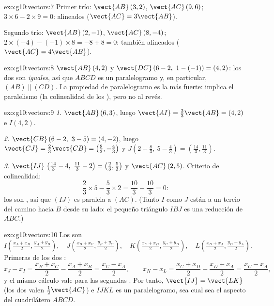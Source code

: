 \begin{solution}{exo:g10:vectors:7}
Primer trío: $\vect{AB}\,(3, 2)$, $\vect{AC}\,(9, 6)$;
$3 \times 6 - 2 \times 9 = 0$: alineados ($\vect{AC} = 3\vect{AB}$).

Segundo trío: $\vect{AB}\,(2, -1)$, $\vect{AC}\,(8, -4)$;
$2 \times (-4) - (-1) \times 8 = -8 + 8 = 0$: también alineados
($\vect{AC} = 4\vect{AB}$).
\end{solution}

\begin{solution}{exo:g10:vectors:8}
$\vect{AB}\,(4, 2)$ y $\vect{DC}\,(6-2,\ 1-(-1)) = (4, 2)$: los dos
 son \emph{iguales}, así que $ABCD$ es un paralelogramo y, en
particular, $(AB) \parallel (CD)$. La propiedad de paralelogramo es la más
fuerte: implica el paralelismo (la colinealidad de los ), pero no
al revés.
\end{solution}

\begin{solution}{exo:g10:vectors:9}
\emph{1.} $\vect{AB}\,(6, 3)$, luego $\vect{AI} = \frac23\vect{AB} =
(4, 2)$ e $I(4, 2)$.

\emph{2.} $\vect{CB}\,(6-2,\ 3-5) = (4, -2)$, luego
$\vect{CJ} = \frac23\vect{CB} = \left(\frac83, -\frac43\right)$ y
$J\left(2 + \frac83,\ 5 - \frac43\right) = \left(\frac{14}{3},
\frac{11}{3}\right)$.

\emph{3.} $\vect{IJ}\,\left(\frac{14}{3} - 4,\ \frac{11}{3} - 2\right) =
\left(\frac23, \frac53\right)$ y $\vect{AC}\,(2, 5)$. Criterio de
colinealidad:
\[
\frac23 \times 5 - \frac53 \times 2 = \frac{10}{3} - \frac{10}{3} = 0 :
\]
los  son , así que $(IJ)$ es paralela a $(AC)$. (Tanto
$I$ como $J$ están a un tercio del camino hacia $B$ desde su lado: el
pequeño triángulo $IBJ$ es una reducción de $ABC$.)
\end{solution}

\begin{solution}{exo:g10:vectors:10}
Los  son
\[
I\left(\tfrac{x_A + x_B}{2}, \tfrac{y_A + y_B}{2}\right), \quad
J\left(\tfrac{x_B + x_C}{2}, \tfrac{y_B + y_C}{2}\right), \quad
K\left(\tfrac{x_C + x_D}{2}, \tfrac{y_C + y_D}{2}\right), \quad
L\left(\tfrac{x_D + x_A}{2}, \tfrac{y_D + y_A}{2}\right).
\]
Primeras  de los dos :
\[
x_J - x_I = \frac{x_B + x_C}{2} - \frac{x_A + x_B}{2}
= \frac{x_C - x_A}{2},
\qquad
x_K - x_L = \frac{x_C + x_D}{2} - \frac{x_D + x_A}{2}
= \frac{x_C - x_A}{2},
\]
y el mismo cálculo vale para las segundas . Por tanto,
$\vect{IJ} = \vect{LK}$ (los dos valen $\frac12\vect{AC}$) e $IJKL$ es un
paralelogramo, sea cual sea el aspecto del cuadrilátero $ABCD$.
\end{solution}

